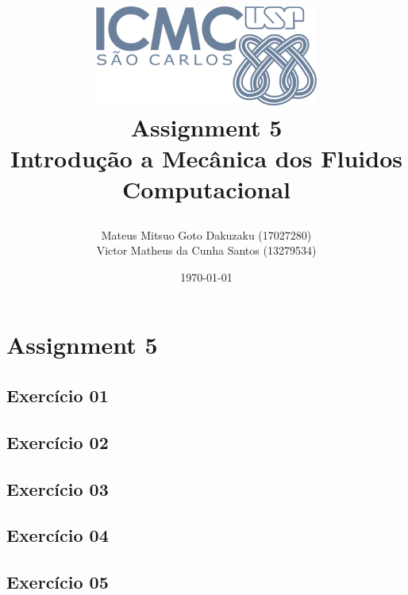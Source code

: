 \documentclass[a4paper,12pt]{article}
\title{
    \vspace{2cm} %
    \includegraphics[width=0.55\textwidth]{Figuras/logo_icmc.png} \\ %
    \vspace{1cm} %
    \textbf{\Huge Assignment 5} \\
    \vspace{1cm} %
    \large Introdução a Mecânica dos Fluidos Computacional \\
    \vspace{0.5cm} %
    
}
\author{Mateus Mitsuo Goto Dakuzaku (17027280)\\ Victor Matheus da Cunha Santos (13279534) }
\date{\today}
\begin{document}
\maketitle
\thispagestyle{empty}
\newpage

\tableofcontents
\newpage

\section{Assignment 5}

\subsection{Exercício 01}

\subsection{Exercício 02}

\subsection{Exercício 03}

\subsection{Exercício 04}

\subsection{Exercício 05}





\newpage

\nocite{FABRICIO_ROBERTO_2025_MEC_FLU}
\end{document}
